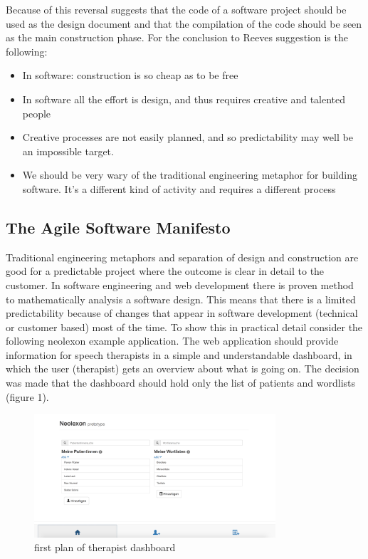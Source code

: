 Because of this reversal \cite{reeves1992software} suggests that the code of a software project should be used as the design document and that the compilation of the
code should be seen as the main construction phase. For \cite{fowler2001new} the conclusion to Reeves suggestion is the following:
\begin{itemize}
  \item In software: construction is so cheap as to be free
  \item In software all the effort is design, and thus requires creative and talented people
  \item Creative processes are not easily planned, and so predictability may well be an impossible target.
  \item We should be very wary of the traditional engineering metaphor for building software. It's a different kind of activity and requires a different process
\end{itemize} \cite{fowler2001new}

\newpage

\subsection{The Agile Software Manifesto}
Traditional engineering metaphors and separation of design and construction are good for a predictable project where the outcome is clear in
detail to the customer. In software engineering and web development there is proven method to mathematically analysis a software design. This means that there is
a limited predictability because of changes that appear in software development (technical or customer based) most of the time. To show this in practical detail
consider the following neolexon example application. The web application should provide information for speech therapists in a simple and understandable dashboard,
in which the user (therapist) gets an overview about what is going on. The decision was made that the dashboard should hold only the list of patients and wordlists (figure 1).

\begin{figure}[h!]
  \centering
  \includegraphics[width=0.8\textwidth]{images/patientsandlists.png}
  \caption{first plan of therapist dashboard}
\end{figure}


